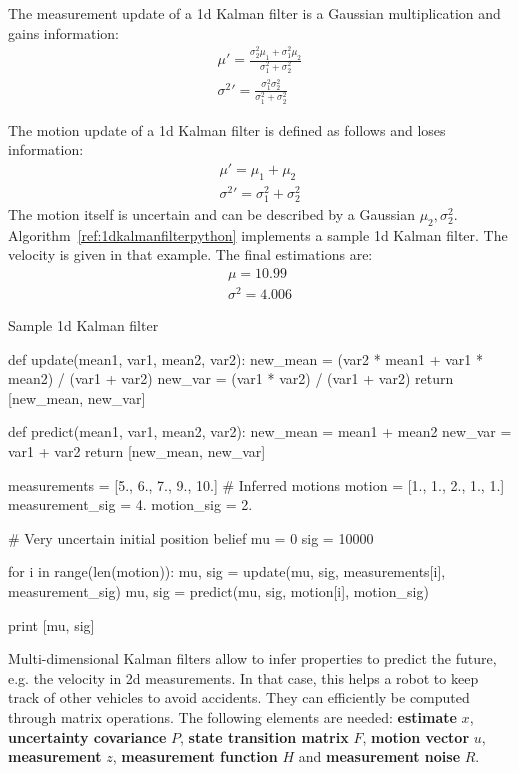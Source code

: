 \documentclass{report}
\begin{document}
The measurement update of a 1d Kalman filter is a Gaussian multiplication and gains information:
\begin{align*}
\mu\prime = \frac{\sigma_2^2\mu_1 + \sigma_1^2\mu_2}{\sigma_1^2 + \sigma_2^2} \\
\sigma^{2}\prime = \frac{\sigma_1^2\sigma_2^2}{\sigma_1^2+\sigma_2^2}
\end{align*}

The motion update of a 1d Kalman filter is defined as follows and loses information:
\begin{align*}
\mu\prime = \mu_1 + \mu_2 \\
\sigma^{2}\prime = \sigma_1^2 + \sigma_2^2
\end{align*}
The motion itself is uncertain and can be described by a Gaussian $\mu_2, \sigma_2^2$. Algorithm~\ref{ref:1dkalmanfilterpython} implements a sample 1d Kalman filter. The velocity is given in that example. The final estimations are:
\begin{align*}
\mu = 10.99 \\
\sigma^2 = 4.006
\end{align*}

\begin{algorithm}
\caption{Sample 1d Kalman filter}
\label{ref:1dkalmanfilterpython}
\begin{python}
def update(mean1, var1, mean2, var2):
    new_mean = (var2 * mean1 + var1 * mean2) / (var1 + var2)
    new_var = (var1 * var2) / (var1 + var2)
    return [new_mean, new_var]

def predict(mean1, var1, mean2, var2):
    new_mean = mean1 + mean2
    new_var = var1 + var2
    return [new_mean, new_var]

measurements = [5., 6., 7., 9., 10.]
# Inferred motions
motion = [1., 1., 2., 1., 1.]
measurement_sig = 4.
motion_sig = 2.

# Very uncertain initial position belief
mu = 0
sig = 10000

for i in range(len(motion)):
    mu, sig = update(mu, sig, measurements[i], measurement_sig)
    mu, sig = predict(mu, sig, motion[i], motion_sig)

print [mu, sig]

\end{python}
\end{algorithm}


Multi-dimensional Kalman filters allow to infer properties to predict the future, e.g. the velocity in 2d measurements. In that case, this helps a robot to keep track of other vehicles to avoid accidents. They can efficiently be computed through matrix operations. The following elements are needed: {\bf estimate} $x$, {\bf uncertainty covariance} $P$, {\bf state transition matrix} $F$, {\bf motion vector} $u$, {\bf measurement} $z$, {\bf measurement function} $H$ and {\bf measurement noise} $R$. \\
\end{document}
